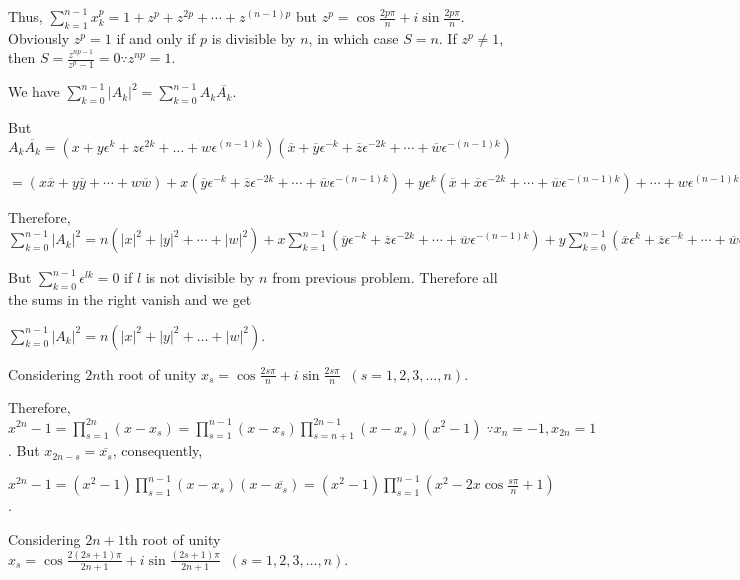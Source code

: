   Thus, $\displaystyle\sum_{k = 1}^{n - 1}x_k^p = 1 + z^p + z^{2p} + \cdots + z^{(n - 1)p}$ but $z^p =
  \cos\frac{2p\pi}{n} + i\sin\frac{2p\pi}{n}$. Obviously $z^p = 1$ if and only if $p$ is divisible by $n$,
  in which case $S = n$. If $z^p\neq 1$, then $S = \frac{z^{np - 1}}{z^p - 1} = 0\because z^{np} = 1$.
\item We have $\displaystyle\sum_{k=0}^{n - 1}|A_k|^2 = \sum_{k=0}^{n - 1}A_k\overline{A_k}$.

  But $A_k\overline{A_k} = (x + y\epsilon^k + z\epsilon^{2k} + \ldots + w\epsilon^{(n - 1)k})(\overline{x} +
  \overline{y}\epsilon^{-k} + \overline{z}\epsilon^{-2k} + \cdots + \overline{w}\epsilon^{-(n - 1)k})$

  $= (x\overline{x} + y\overline{y} + \cdots + w\overline{w})+ x(\overline{y}\epsilon^{-k} +
  \overline{z}\epsilon^{-2k} + \cdots + \overline{w}\epsilon^{-(n - 1)k}) + y\epsilon^k(\overline{x} +
  \overline{x}\epsilon^{-2k} + \cdots + \overline{w}\epsilon^{-(n - 1)k}) + \cdots + w\epsilon^{(n -
    1)k}(\overline{x} + \overline{y}\epsilon^{-k} + \cdots + \overline{u}\epsilon^{-(n - 2)k})$

  Therefore, $\displaystyle\sum_{k=0}^{n - 1}|A_k|^2 = n(|x|^2 + |y|^2 + \cdots + |w|^2) + x\sum_{k=1}^{n -
    1}(\overline{y}\epsilon^{-k} + \overline{z}\epsilon^{-2k} + \cdots + \overline{w}\epsilon^{-(n - 1)k}) +
  y\sum_{k=0}^{n - 1}(\overline{x}\epsilon^k + \overline{z}\epsilon^{-k} + \cdots +
  \overline{w}\epsilon^{-(n - 2)k}) + \cdots + w\sum_{k = 0}^{n - 1}(\overline{x}\epsilon^{(n - 1)k}+
  \overline{y}\epsilon^{(n - 2)k} + \cdots + \overline{u}\epsilon^k)$

  But $\displaystyle\sum_{k=0}^{n - 1}\epsilon^{lk} = 0$ if $l$ is not divisible by $n$ from previous
  problem. Therefore all the sums in the right vanish and we get

  $\displaystyle\sum_{k = 0}^{n - 1}|A_k|^2 = n(|x|^2 + |y|^2 + \ldots + |w|^2)$.
\item Considering $2n$th root of unity $x_s = \cos\frac{2s\pi}{n} + i\sin\frac{2s\pi}{n}\;\;(s = 1, 2, 3,
  \ldots, n)$.

  Therefore, $x^{2n} - 1 = \displaystyle\prod_{s=1}^{2n}(x - x_s) = \prod_{s=1}^{n - 1}(x - x_s)
  \prod_{s=n + 1}^{2n - 1}(x - x_s)(x^2 - 1)\;\because x_n = -1, x_{2n} = 1$. But $x_{2n - s} =
  \overline{x_s}$, consequently,

  $x^{2n} - 1 = (x^2 - 1)\displaystyle\prod_{s = 1}^{n - 1}(x - x_s)(x - \overline{x_s}) = (x^2 - 1)\prod_{s
    = 1}^{n - 1}(x^2 - 2x\cos\frac{s\pi}{n} + 1)$.
\item Considering $2n + 1$th root of unity $x_s = \cos\frac{2(2s + 1)\pi}{2n + 1} + i\sin\frac{(2s +
  1)\pi}{2n + 1}\;\;(s = 1, 2, 3, \ldots, n)$.

